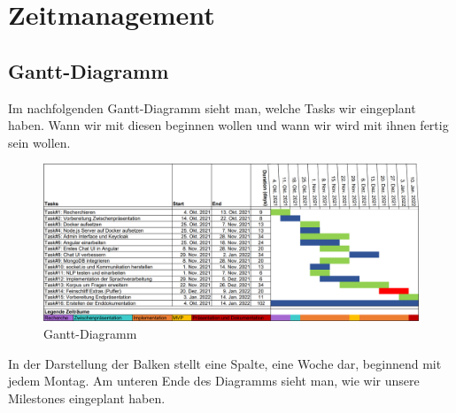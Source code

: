 \section{Zeitmanagement}

\subsection{Gantt-Diagramm}

Im nachfolgenden Gantt-Diagramm sieht man, welche Tasks wir eingeplant haben.
Wann wir mit diesen beginnen wollen und wann wir wird mit ihnen fertig sein wollen.

\begin{figure}[H]
    \centering
    \includegraphics[width=1.0\textwidth]{bilder/zeitmanagement/gantt-diagramm.png}
    \caption{Gantt-Diagramm}
    \label{fig:Gantt-Diagramm}
\end{figure}

\noindent In der Darstellung der Balken stellt eine Spalte, eine Woche dar, beginnend mit jedem Montag.
Am unteren Ende des Diagramms sieht man, wie wir unsere Milestones eingeplant haben.